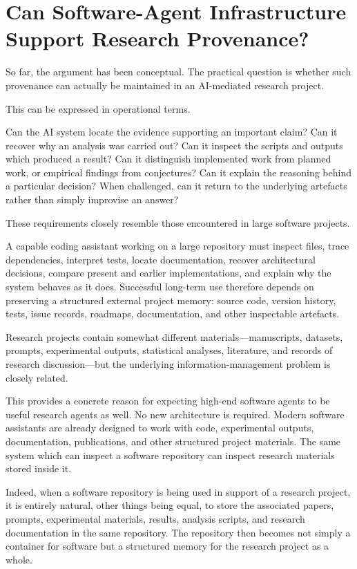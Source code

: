 \documentclass[12pt]{article}
\begin{document}
\section{Can Software-Agent Infrastructure Support Research Provenance?}

So far, the argument has been conceptual. The practical question is whether such provenance can actually be maintained in an AI-mediated research project.

This can be expressed in operational terms.

Can the AI system locate the evidence supporting an important claim? Can it recover why an analysis was carried out? Can it inspect the scripts and outputs which produced a result? Can it distinguish implemented work from planned work, or empirical findings from conjectures? Can it explain the reasoning behind a particular decision? When challenged, can it return to the underlying artefacts rather than simply improvise an answer?

These requirements closely resemble those encountered in large software projects.

A capable coding assistant working on a large repository must inspect files, trace dependencies, interpret tests, locate documentation, recover architectural decisions, compare present and earlier implementations, and explain why the system behaves as it does. Successful long-term use therefore depends on preserving a structured external project memory: source code, version history, tests, issue records, roadmaps, documentation, and other inspectable artefacts.

Research projects contain somewhat different materials---manuscripts, datasets, prompts, experimental outputs, statistical analyses, literature, and records of research discussion---but the underlying information-management problem is closely related.

This provides a concrete reason for expecting high-end software agents to be useful research agents as well. No new architecture is required. Modern software assistants are already designed to work with code, experimental outputs, documentation, publications, and other structured project materials. The same system which can inspect a software repository can inspect research materials stored inside it.

Indeed, when a software repository is being used in support of a research project, it is entirely natural, other things being equal, to store the associated papers, prompts, experimental materials, results, analysis scripts, and research documentation in the same repository. The repository then becomes not simply a container for software but a structured memory for the research project as a whole.
\end{document}
